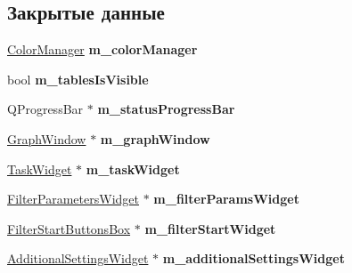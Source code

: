 \subsection*{Закрытые данные}
\begin{DoxyCompactItemize}
\item 
\hyperlink{class_color_manager}{Color\+Manager} {\bfseries m\+\_\+color\+Manager}\hypertarget{class_main_window_a6c0331486f528b76b569fc02baf1037e}{}\label{class_main_window_a6c0331486f528b76b569fc02baf1037e}

\item 
bool {\bfseries m\+\_\+tables\+Is\+Visible}\hypertarget{class_main_window_a6ea719792b7699a0d5e81181ba6f5b2c}{}\label{class_main_window_a6ea719792b7699a0d5e81181ba6f5b2c}

\item 
Q\+Progress\+Bar $\ast$ {\bfseries m\+\_\+status\+Progress\+Bar}\hypertarget{class_main_window_a17685071143ec93292f9e6909ab78901}{}\label{class_main_window_a17685071143ec93292f9e6909ab78901}

\item 
\hyperlink{class_graph_window}{Graph\+Window} $\ast$ {\bfseries m\+\_\+graph\+Window}\hypertarget{class_main_window_a7f1ee1494ff008c4a7f6d395ecaac87e}{}\label{class_main_window_a7f1ee1494ff008c4a7f6d395ecaac87e}

\item 
\hyperlink{class_task_widget}{Task\+Widget} $\ast$ {\bfseries m\+\_\+task\+Widget}\hypertarget{class_main_window_acc365673b948684fd72adbf4924c0c97}{}\label{class_main_window_acc365673b948684fd72adbf4924c0c97}

\item 
\hyperlink{class_filter_parameters_widget}{Filter\+Parameters\+Widget} $\ast$ {\bfseries m\+\_\+filter\+Params\+Widget}\hypertarget{class_main_window_a463e4f6880ba393e7b8d3de20e7fc96a}{}\label{class_main_window_a463e4f6880ba393e7b8d3de20e7fc96a}

\item 
\hyperlink{class_filter_start_buttons_box}{Filter\+Start\+Buttons\+Box} $\ast$ {\bfseries m\+\_\+filter\+Start\+Widget}\hypertarget{class_main_window_a88d26017f0ec68df1ec9a8d9cd53fd8a}{}\label{class_main_window_a88d26017f0ec68df1ec9a8d9cd53fd8a}

\item 
\hyperlink{class_additional_settings_widget}{Additional\+Settings\+Widget} $\ast$ {\bfseries m\+\_\+additional\+Settings\+Widget}\hypertarget{class_main_window_a8e9f2e35383ec89002744d7dd52cb508}{}\label{class_main_window_a8e9f2e35383ec89002744d7dd52cb508}


\end{DoxyCompactItemize}
